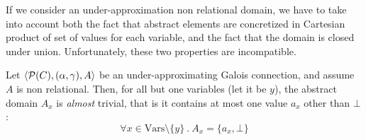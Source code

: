 If we consider an under-approximation non relational domain, we have to take into account both the fact that abstract elements are concretized in Cartesian product of set of values for each variable, and the fact that the domain is closed under union. Unfortunately, these two properties are incompatible.
\begin{prop}\label{ch4:th:underapprox-non-rel}
	Let $\langle \mathcal{P}(C), (\alpha, \gamma), A \rangle$ be an under-approximating Galois connection, and assume $A$ is non relational. Then, for all but one variables (let it be $y$), the abstract domain $A_x$ is \textit{almost} trivial, that is it contains at most one value $a_x$ other than $\bot$:
	\[
	\forall x \in \text{Vars} \setminus \{ y \} \ .\ A_x = \{ a_x, \bot \}
	\]
\end{prop}
\begin{figure}[!ht]
\end{figure}

